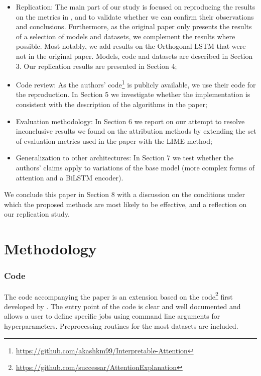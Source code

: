 \begin{itemize}
    \item Replication: The main part of our study is focused on reproducing the results on the metrics in \citet{mohankumar_towards_2020}, and to validate whether we can confirm their observations and conclusions. Furthermore, as the original paper only presents the results of a selection of models and datasets, we complement the results where possible. Most notably, we add results on the Orthogonal LSTM that were not in the original paper. Models, code and datasets are described in Section 3.  Our replication results are presented in Section 4;
    \item Code review: As the authors' code\footnote{\scriptsize  \url{https://github.com/akashkm99/Interpretable-Attention}} is publicly available, we use their code for the reproduction. In Section 5 we investigate whether the implementation is consistent with the description of the algorithms in the paper;
    \item Evaluation methodology: In Section 6 we report on our attempt to resolve inconclusive results we found on the attribution methods by extending the set of evaluation metrics used in the paper with the LIME method;
    \item Generalization to other architectures: In Section 7 we test whether the authors' claims apply to variations of the base model (more complex forms of attention and a BiLSTM encoder).
\end{itemize}
We conclude this paper in Section 8 with a discussion on the conditions under which the proposed methods are most likely to be effective, and a reflection on our replication study.

\section{Methodology}

\subsubsection{Code}
The code accompanying the paper is an extension based on the code\footnote{\scriptsize  \url{https://github.com/successar/AttentionExplanation}} first developed by \citet{jain-wallace-2019-attention}. The entry point of the code is clear and well documented and allows a user to define specific jobs using command line arguments for hyperparameters. Preprocessing routines for the most datasets are included. 

